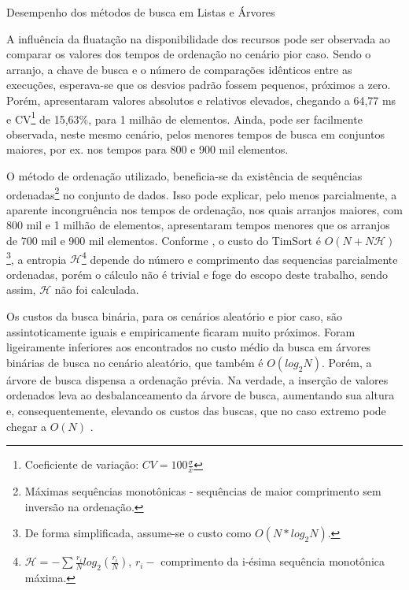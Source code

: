 \documentclass[12pt]{article}
\begin{document}
\begin{table}
    \centering
    \resizebox{0.9\textwidth}{!}{
        
    }
    \caption{Desempenho dos métodos de busca em Listas e Árvores}
    \label{tab:resultados2}
\end{table}

A influência da fluatação na disponibilidade dos recursos pode ser observada ao comparar os valores dos tempos de ordenação no cenário pior caso. Sendo o arranjo, a chave de busca e o número de comparações idênticos entre as execuções, esperava-se que os desvios padrão fossem pequenos, próximos a zero. Porém, apresentaram valores absolutos e relativos elevados, chegando a 64,77 ms e CV\footnote{Coeficiente de variação: $CV=100\frac{\sigma}{\bar{x}}$} de 15,63\%, para 1 milhão de elementos. Ainda, pode ser facilmente observada, neste mesmo cenário, pelos menores tempos de busca em conjuntos maiores, por ex. nos tempos para 800 e 900 mil elementos.

O método de ordenação utilizado, beneficia-se da existência de sequências ordenadas\footnote{Máximas sequências monotônicas - sequências de maior comprimento sem inversão na ordenação.} no conjunto de dados. Isso pode explicar, pelo menos parcialmente, a aparente incongruência nos tempos de ordenação, nos quais arranjos maiores, com 800 mil e 1 milhão de elementos, apresentaram tempos menores que os arranjos de 700 mil e 900 mil elementos. Conforme \cite{auger:hal-01798381}, o custo do TimSort é $O(N + N\mathcal{H})$\footnote{De forma simplificada, assume-se o custo como $O(N*log_{2}N)$.}, a entropia $\mathcal{H}$\footnote{$\mathcal{H}=-\sum{\frac{r_{i}}{N} log_{2}(\frac{r_{i}}{N})}$, $r_{i} - $ comprimento da i-ésima sequência monotônica máxima.} depende do número e comprimento das sequencias parcialmente ordenadas, porém o cálculo não é trivial e foge do escopo deste trabalho, sendo assim, $\mathcal{H}$ não foi calculada.

Os custos da busca binária, para os cenários aleatório e pior caso, são assintoticamente iguais e empiricamente ficaram muito próximos. Foram ligeiramente inferiores aos encontrados no custo médio da busca em árvores binárias de busca no cenário aleatório, que também é $O(log_{2} N)$. Porém, a árvore de busca dispensa a ordenação prévia. Na verdade, a inserção de valores ordenados leva ao desbalanceamento da árvore de busca, aumentando sua altura e, consequentemente, elevando os custos das buscas, que no caso extremo pode chegar a $O(N)$ \cite[p.72]{gonnet_handbook_1984}.
\end{document}
